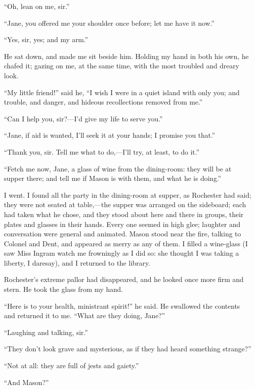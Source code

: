 \enquote{Oh, lean on me, sir.}

\enquote{Jane, you offered me your shoulder once before; let me have it
	now.}

\enquote{Yes, sir, yes; and my arm.}

He sat down, and made me sit beside him. Holding my hand in both his
own, he chafed it; gazing on me, at the same time, with the most
troubled and dreary look.

\enquote{My little friend!} said he, \enquote{I wish I were in a quiet
	island with only you; and trouble, and danger, and hideous recollections
	removed from me.}

\enquote{Can I help you, sir?---I'd give my life to serve you.}

\enquote{Jane, if aid is wanted, I'll seek it at your hands; I promise
	you that.}

\enquote{Thank you, sir. Tell me what to do,---I'll try, at least, to
	do it.}

\enquote{Fetch me now, Jane, a glass of wine from the dining-room: they
	will be at supper there; and tell me if Mason is with them, and what he
	is doing.}

I went. I found all the party in the dining-room at supper, as \Mr{}
Rochester had said; they were not seated at table,---the supper was
arranged on the sideboard; each had taken what he chose, and they stood
about here and there in groups, their plates and glasses in their
hands. Every one seemed in high glee; laughter and conversation were
general and animated. \Mr{} Mason stood near the fire, talking to Colonel
and \Mrs{} Dent, and appeared as merry as any of them. I filled a
wine-glass (I saw Miss Ingram watch me frowningly as I did so: she
thought I was taking a liberty, I daresay), and I returned to the
library.

\Mr{} Rochester's extreme pallor had disappeared, and he looked once more
firm and stern. He took the glass from my hand.

\enquote{Here is to your health, ministrant spirit!} he said. He
swallowed the contents and returned it to me. \enquote{What are they
	doing, Jane?}

\enquote{Laughing and talking, sir.}

\enquote{They don't look grave and mysterious, as if they had heard
	something strange?}

\enquote{Not at all: they are full of jests and gaiety.}

\enquote{And Mason?}

